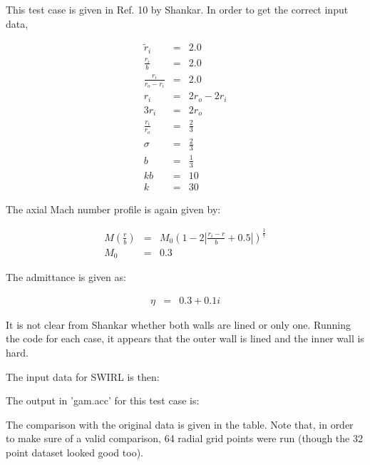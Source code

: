 \documentclass[12pt]{article}
\begin{document}
This test case is given in Ref. 10 by Shankar.   In order to
get the correct input data,

\begin{eqnarray}
\widetilde{r}_i  
&=& 2.0
\nonumber
\\
\frac{r_i}{b}
&=& 2.0
\nonumber
\\
\frac{r_i}{r_o - r_i}
&=& 2.0
\nonumber
\\
r_i
&=& 2 r_o - 2 r_i
\nonumber
\\
3 r_i
&=& 2 r_o 
\nonumber
\\
\frac{r_i}{r_o}
&=& \frac{2}{3} 
\nonumber
\\
\sigma &=& \frac{2}{3}
\nonumber
\\
b &=& \frac{1}{3}
\nonumber
\\
k b &=& 10
\nonumber
\\
k &=& 30
\nonumber
\end{eqnarray}

The axial Mach number profile is again given by:

\begin{eqnarray}
M \left(\frac{r}{b} \right)
&=&
M_0 \left(1 - 2 \left| \frac{r_i - r}{b} + 0.5 \right| \right)^{\frac{1}{7}}
\nonumber
\\
M_0 &=& 0.3
\nonumber
\end{eqnarray}

The admittance is given as:

\begin{eqnarray}
\eta &=& 0.3 + 0.1 i
\nonumber
\end{eqnarray}


It is not clear from Shankar whether both walls are lined or only one.
Running the code for each case, it appears that the outer wall is lined
and the inner wall is hard.

The input data for SWIRL is then:

\begin{tiny}
\end{tiny}%

The output in 'gam.acc' for this test case is:

\begin{tiny}
\end{tiny}%

The comparison with the original data is given in the table.  Note that, in order to
make sure of a valid comparison, 64 radial grid points were run (though the 32 point
dataset looked good too).
\end{document}
